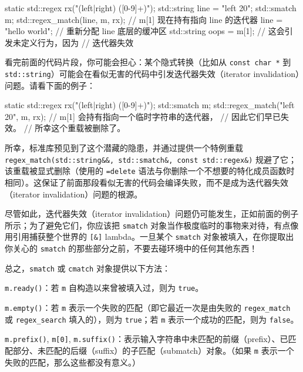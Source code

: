 \begin{codebox}[cpp]
    static std::regex rx("(left|right) ([0-9]+)");
    std::string line = "left 20";
    std::smatch m;
    std::regex_match(line, m, rx);
      // m[1] 现在持有指向 line 的迭代器
    line = "hello world";
      // 重新分配 line 底层的缓冲区
    std::string oops = m[1];
      // 这会引发未定义行为，因为
      // 迭代器失效
\end{codebox}

看完前面的代码片段，你可能会担心：某个隐式转换（比如从 \texttt{const char *} 到 \texttt{std::\allowbreak{}string}）可能会在看似无害的代码中引发迭代器失效（iterator invalidation）问题。请看下面的例子：

\begin{codebox}[cpp]
    static std::regex rx("(left|right) ([0-9]+)");
    std::smatch m;
    std::regex_match("left 20", m, rx);
      // m[1] 会持有指向一个临时字符串的迭代器，
      // 因此它们早已失效。
      // 所幸这个重载被删除了。
\end{codebox}

所幸，标准库预见到了这个潜藏的隐患，并通过提供一个特例重载 \texttt{regex\_\allowbreak{}match(\allowbreak{}std::\allowbreak{}string\&\&,\allowbreak{} std::\allowbreak{}smatch\&,\allowbreak{} const std::\allowbreak{}regex\&)\allowbreak{}} 规避了它；该重载被显式删除（使用的 \texttt{=delete} 语法与你删除一个不想要的特化成员函数时相同）。这保证了前面那段看似无害的代码会编译失败，而不是成为迭代器失效（iterator invalidation）问题的根源。

尽管如此，迭代器失效（iterator invalidation）问题仍可能发生，正如前面的例子所示；为了避免它们，你应该把 \texttt{smatch} 对象当作极度临时的事物来对待，有点像用引用捕获整个世界的 \texttt{[\&]} lambda。一旦某个 \texttt{smatch} 对象被填入，在你提取出你关心的 \texttt{smatch} 的那些部分之前，不要去碰环境中的任何其他东西！

总之，\texttt{smatch} 或 \texttt{cmatch} 对象提供以下方法：

\texttt{m.\allowbreak{}ready(\allowbreak{})\allowbreak{}}：若 \texttt{m} 自构造以来曾被填入过，则为 \texttt{true}。

\texttt{m.\allowbreak{}empty(\allowbreak{})\allowbreak{}}：若 \texttt{m} 表示一个失败的匹配（即它最近一次是由失败的 \texttt{regex\_\allowbreak{}match} 或 \texttt{regex\_\allowbreak{}search} 填入的），则为 \texttt{true}；若 \texttt{m} 表示一个成功的匹配，则为 \texttt{false}。

\texttt{m.\allowbreak{}prefix(\allowbreak{})\allowbreak{}}, \texttt{m[0]}, \texttt{m.\allowbreak{}suffix(\allowbreak{})\allowbreak{}}：表示输入字符串中未匹配的前缀（prefix）、已匹配部分、未匹配的后缀（suffix）的子匹配（submatch）对象。（如果 \texttt{m} 表示一个失败的匹配，那么这些都没有意义。）

